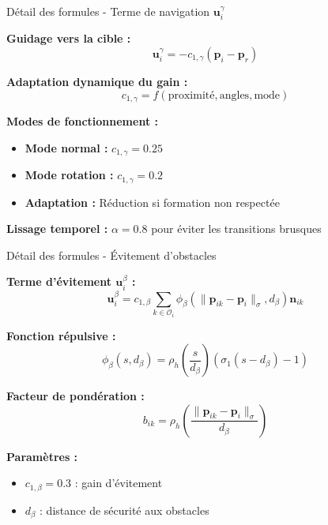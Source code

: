 \begin{frame}{Détail des formules - Terme de navigation $\mathbf{u}_i^{\gamma}$}

\textbf{Guidage vers la cible :}
\begin{equation}
\mathbf{u}_i^{\gamma} = -c_{1,\gamma}(\mathbf{p}_i - \mathbf{p}_r)
\end{equation}

\textbf{Adaptation dynamique du gain :}
\begin{equation}
c_{1,\gamma} = f(\text{proximité}, \text{angles}, \text{mode})
\end{equation}

\textbf{Modes de fonctionnement :}
\begin{itemize}
\item \textbf{Mode normal :} $c_{1,\gamma} = 0.25$
\item \textbf{Mode rotation :} $c_{1,\gamma} = 0.2$
\item \textbf{Adaptation :} Réduction si formation non respectée
\end{itemize}

\textbf{Lissage temporel :} $\alpha = 0.8$ pour éviter les transitions brusques

\end{frame}

\begin{frame}{Détail des formules - Évitement d'obstacles}

\textbf{Terme d'évitement $\mathbf{u}_i^{\beta}$ :}
\begin{equation}
\mathbf{u}_i^{\beta} = c_{1,\beta} \sum_{k \in \mathcal{O}_i} \phi_{\beta}(\|\mathbf{p}_{ik} - \mathbf{p}_i\|_\sigma, d_{\beta}) \mathbf{n}_{ik}
\end{equation}

\textbf{Fonction répulsive :}
\begin{equation}
\phi_{\beta}(s, d_{\beta}) = \rho_h\left(\frac{s}{d_{\beta}}\right) \left(\sigma_1(s - d_{\beta}) - 1\right)
\end{equation}

\textbf{Facteur de pondération :}
\begin{equation}
b_{ik} = \rho_h\left(\frac{\|\mathbf{p}_{ik} - \mathbf{p}_i\|_\sigma}{d_{\beta}}\right)
\end{equation}

\textbf{Paramètres :}
\begin{itemize}
\item $c_{1,\beta} = 0.3$ : gain d'évitement
\item $d_{\beta}$ : distance de sécurité aux obstacles
\end{itemize}

\end{frame}


